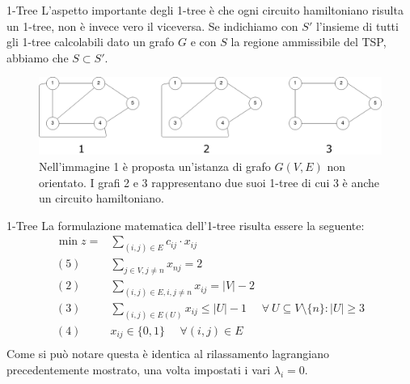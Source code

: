 \documentclass[10pt]{beamer}
\begin{document}
    \begin{frame}{1-Tree}
        L'aspetto importante degli 1-tree è che ogni circuito hamiltoniano risulta un 1-tree, non è invece vero il viceversa.
        Se indichiamo con $S'$ l'insieme di tutti gli 1-tree calcolabili dato un grafo $G$ e con $S$ la regione ammissibile del TSP, abbiamo che $S \subset S'$.

        \begin{figure}
            \centering
            \includegraphics[scale=0.21]{files/1TreeEsempi}
            \caption{Nell'immagine 1 è proposta un'istanza di grafo $G(V,E)$ non orientato. I grafi 2 e 3 rappresentano due suoi 1-tree di cui 3 è anche un circuito hamiltoniano.}\label{fig:figure}
        \end{figure}


    \end{frame}

    \begin{frame}{1-Tree}
        La formulazione matematica dell'1-tree risulta essere la seguente:
        \begin{equation*}
            \begin{split}
                \min z = & \sum_{(i,j) \in E} c_{ij} \cdot x_{ij}\\
                (5)\:\:\:\:\:\: & \sum_{j \in V, j \neq n} x_{nj} = 2 \\
                (2) \:\:\:\:\:\: & \sum_{(i,j)\in E, i, j \neq n} x_{ij} = |V|-2 \\
                (3) \:\:\:\:\:\: & \sum_{(i,j) \in E(U)} x_{ij} \leq |U| - 1 \:\:\:\:\:\: \forall\: U \subseteq V\setminus\{n\} : |U| \geq 3 \\
                (4) \:\:\:\:\:\: & x_{ij} \in \{0,1\} \:\:\:\:\:\: \forall (i,j) \in E\\
            \end{split}
        \end{equation*}
        Come si può notare questa è identica al rilassamento lagrangiano precedentemente mostrato, una volta impostati i vari $\lambda_i = 0$.
    \end{frame}
\end{document}
